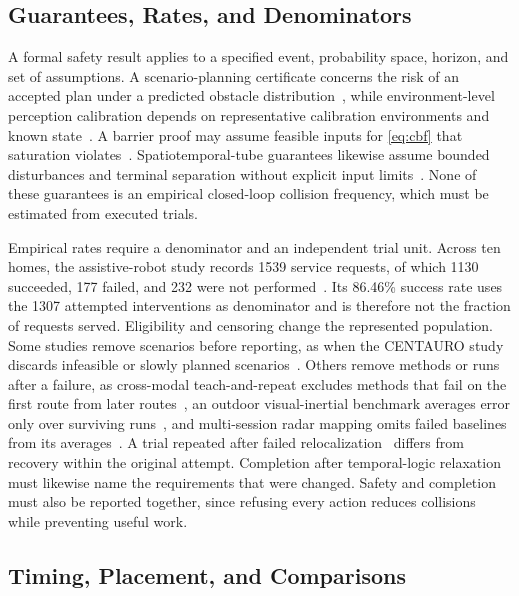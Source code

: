 \subsection{Guarantees, Rates, and Denominators}

A formal safety result applies to a specified event, probability space, horizon, and set of assumptions. A scenario-planning certificate concerns the risk of an accepted plan under a predicted obstacle distribution~\cite{P_E25}, while environment-level perception calibration depends on representative calibration environments and known state~\cite{P_F08}. A barrier proof may assume feasible inputs for \eqref{eq:cbf} that saturation violates~\cite{P_E26}. Spatiotemporal-tube guarantees likewise assume bounded disturbances and terminal separation without explicit input limits~\cite{P_N12}. None of these guarantees is an empirical closed-loop collision frequency, which must be estimated from executed trials.

Empirical rates require a denominator and an independent trial unit. Across ten homes, the assistive-robot study records 1539 service requests, of which 1130 succeeded, 177 failed, and 232 were not performed~\cite{P_M37}. Its 86.46\% success rate uses the 1307 attempted interventions as denominator and is therefore not the fraction of requests served. Eligibility and censoring change the represented population. Some studies remove scenarios before reporting, as when the CENTAURO study discards infeasible or slowly planned scenarios~\cite{P_N17}. Others remove methods or runs after a failure, as cross-modal teach-and-repeat excludes methods that fail on the first route from later routes~\cite{P_R11}, an outdoor visual-inertial benchmark averages error only over surviving runs~\cite{P_S19}, and multi-session radar mapping omits failed baselines from its averages~\cite{P_R09}. A trial repeated after failed relocalization~\cite{P_N10} differs from recovery within the original attempt. Completion after temporal-logic relaxation~\cite{P_N15} must likewise name the requirements that were changed. Safety and completion must also be reported together, since refusing every action reduces collisions while preventing useful work.

\subsection{Timing, Placement, and Comparisons}

